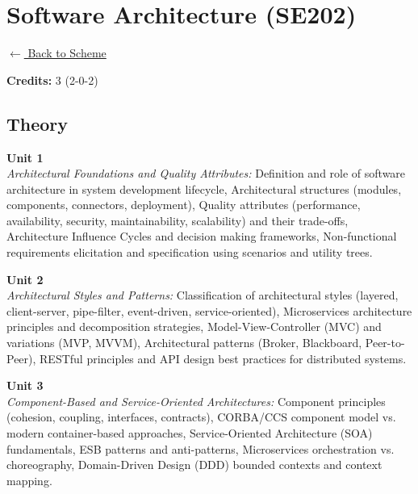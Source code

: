 \section*{Software Architecture (SE202)}
\label{major:SE_2}

\noindent \small{\hyperref[main:scheme]{$\leftarrow$ Back to Scheme}} \vspace{0.5cm}

\noindent \textbf{Credits:} 3 (2-0-2)

\subsection*{Theory}
\noindent\textbf{Unit 1} \\
\textit{Architectural Foundations and Quality Attributes:} Definition and role of software architecture in system development lifecycle, Architectural structures (modules, components, connectors, deployment), Quality attributes (performance, availability, security, maintainability, scalability) and their trade-offs, Architecture Influence Cycles and decision making frameworks, Non-functional requirements elicitation and specification using scenarios and utility trees.

\vspace{0.3cm}

\noindent\textbf{Unit 2} \\
\textit{Architectural Styles and Patterns:} Classification of architectural styles (layered, client-server, pipe-filter, event-driven, service-oriented), Microservices architecture principles and decomposition strategies, Model-View-Controller (MVC) and variations (MVP, MVVM), Architectural patterns (Broker, Blackboard, Peer-to-Peer), RESTful principles and API design best practices for distributed systems.

\vspace{0.3cm}

\noindent\textbf{Unit 3} \\
\textit{Component-Based and Service-Oriented Architectures:} Component principles (cohesion, coupling, interfaces, contracts), CORBA/CCS component model vs. modern container-based approaches, Service-Oriented Architecture (SOA) fundamentals, ESB patterns and anti-patterns, Microservices orchestration vs. choreography, Domain-Driven Design (DDD) bounded contexts and context mapping.

\vspace{0.3cm}


